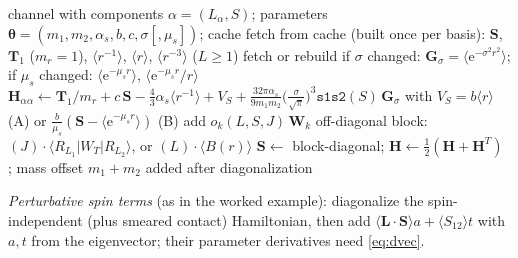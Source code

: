 \documentclass[11pt,a4paper]{article}
\numberwithin{equation}{section}
\theoremstyle{definition}
\theoremstyle{plain}
\theoremstyle{remark}
\numberwithin{algorithm}{section}
\newcommand{\vL}{\bm L}
\newcommand{\vS}{\bm S}
\newcommand{\as}{\alpha_s}
\newcommand{\ee}{\mathrm{e}}
\newcommand{\mr}{m_r}
\newcommand{\mus}{\mu_s}
\newcommand{\mH}{\mathbf H}
\newcommand{\mS}{\mathbf S}
\newcommand{\vth}{\bm\theta}
\begin{document}
\begin{algorithm}[H]
\caption{Assemble one channel of Model A/B}\label{alg:assembleNR}
\begin{algorithmic}[1]
\Require channel with components $\alpha=(L_\alpha,S)$; parameters $\vth=(m_1,m_2,\as,b,c,\sigma[,\mus])$; cache
  \State fetch from cache (built once per basis): $\mS$, $\mathbf T_1$ ($\mr=1$), $\langle r^{-1}\rangle$, $\langle r\rangle$, $\langle r^{-3}\rangle$ ($L\ge1$)
  \State fetch or rebuild if $\sigma$ changed: $\mathbf G_\sigma=\langle\ee^{-\sigma^2r^2}\rangle$; if $\mus$ changed: $\langle\ee^{-\mus r}\rangle$, $\langle\ee^{-\mus r}/r\rangle$
  \State $\mH_{\alpha\alpha}\gets\mathbf T_1/\mr+c\,\mS-\tfrac43\as\langle r^{-1}\rangle+V_S+\tfrac{32\pi\as}{9m_1m_2}\big(\tfrac{\sigma}{\sqrt\pi}\big)^3\mathtt{s1s2}(S)\,\mathbf G_\sigma$
  \Statex \hspace{1.5em}with $V_S=b\langle r\rangle$ (A) or $\frac b{\mus}(\mS-\langle\ee^{-\mus r}\rangle)$ (B)
   add $o_k(L,S,J)\,\mathbf W_k$ \EndIf
\EndFor
{} 
  \State off-diagonal block: $(J)\cdot\langle R_{L_1}|W_T|R_{L_2}\rangle$, or $(L)\cdot\langle B(r)\rangle$
\EndIf
\State $\mS\gets$ block-diagonal; $\mH\gets\frac12(\mH+\mH^T)$
\Ensure {}; mass offset $m_1+m_2$ added after diagonalization
\end{algorithmic}
\end{algorithm}
\emph{Perturbative spin terms} (as in the worked example): diagonalize the spin-independent (plus smeared contact) Hamiltonian, then add $\langle\vL\cdot\vS\rangle a+\langle S_{12}\rangle t$ with $a,t$ from the eigenvector; their parameter derivatives need \eqref{eq:dvec}.
\end{document}
